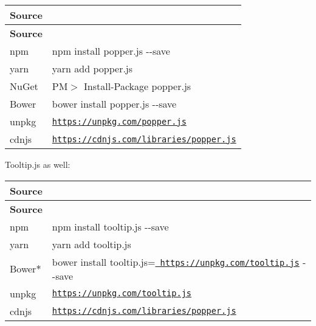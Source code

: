 \tabulinesep=1mm
\begin{longtabu}spread 0pt [c]{*{2}{|X[-1]}|}
\hline
\cellcolor{\tableheadbgcolor}\textbf{ Source  }&\cellcolor{\tableheadbgcolor}\textbf{ }\\
\endfirsthead
\hline
\endfoot
\hline
\cellcolor{\tableheadbgcolor}\textbf{ Source  }&\cellcolor{\tableheadbgcolor}\textbf{ }\\
\endhead
npm  &{\ttfamily npm install popper.\+js -\/-\/save}   \\
yarn  &{\ttfamily yarn add popper.\+js}   \\
Nu\+Get  &{\ttfamily PM$>$ Install-\/\+Package popper.\+js}   \\
Bower  &{\ttfamily bower install popper.\+js -\/-\/save}   \\
unpkg  &\href{https://unpkg.com/popper.js}{\texttt{ {\ttfamily https\+://unpkg.\+com/popper.\+js}}}   \\
cdnjs  &\href{https://cdnjs.com/libraries/popper.js}{\texttt{ {\ttfamily https\+://cdnjs.\+com/libraries/popper.\+js}}}   \\
\end{longtabu}


Tooltip.\+js as well\+:

\tabulinesep=1mm
\begin{longtabu}spread 0pt [c]{*{2}{|X[-1]}|}
\hline
\cellcolor{\tableheadbgcolor}\textbf{ Source  }&\cellcolor{\tableheadbgcolor}\textbf{ }\\
\endfirsthead
\hline
\endfoot
\hline
\cellcolor{\tableheadbgcolor}\textbf{ Source  }&\cellcolor{\tableheadbgcolor}\textbf{ }\\
\endhead
npm  &{\ttfamily npm install tooltip.\+js -\/-\/save}   \\
yarn  &{\ttfamily yarn add tooltip.\+js}   \\
Bower$\ast$  &{\ttfamily bower install tooltip.\+js=\href{https://unpkg.com/tooltip.js}{\texttt{ https\+://unpkg.\+com/tooltip.\+js}} -\/-\/save}   \\
unpkg  &\href{https://unpkg.com/tooltip.js}{\texttt{ {\ttfamily https\+://unpkg.\+com/tooltip.\+js}}}   \\
cdnjs  &\href{https://cdnjs.com/libraries/popper.js}{\texttt{ {\ttfamily https\+://cdnjs.\+com/libraries/popper.\+js}}}   \\
\end{longtabu}


